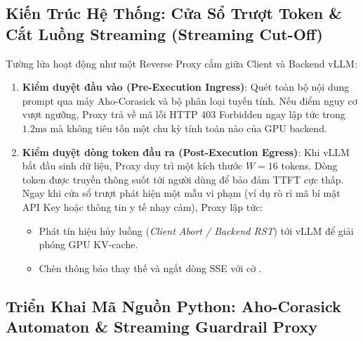 \subsection{Kiến Trúc Hệ Thống: Cửa Sổ Trượt Token \& Cắt Luồng Streaming (Streaming Cut-Off)}
Tường lửa hoạt động như một Reverse Proxy cắm giữa Client và Backend vLLM:
\begin{enumerate}
  \item \textbf{Kiểm duyệt đầu vào (Pre-Execution Ingress)}: Quét toàn bộ nội dung prompt qua máy Aho-Corasick và bộ phân loại tuyến tính. Nếu điểm nguy cơ vượt ngưỡng, Proxy trả về mã lỗi HTTP 403 Forbidden ngay lập tức trong $1.2\text{ms}$ mà không tiêu tốn một chu kỳ tính toán nào của GPU backend.
  \item \textbf{Kiểm duyệt dòng token đầu ra (Post-Execution Egress)}: Khi vLLM bắt đầu sinh dữ liệu, Proxy duy trì một  kích thước $W = 16$ tokens. Dòng token được truyền thông suốt tới người dùng để bảo đảm TTFT cực thấp. Ngay khi cửa sổ trượt phát hiện một mẫu vi phạm (ví dụ rò rỉ mã bí mật API Key hoặc thông tin y tế nhạy cảm), Proxy lập tức:
  \begin{itemize}
    \item Phát tín hiệu hủy luồng (\textit{Client Abort / Backend RST}) tới vLLM để giải phóng GPU KV-cache.
    \item Chèn thông báo thay thế  và ngắt dòng SSE với cờ .
  \end{itemize}
\end{enumerate}

\subsection{Triển Khai Mã Nguồn Python: Aho-Corasick Automaton \& Streaming Guardrail Proxy}

